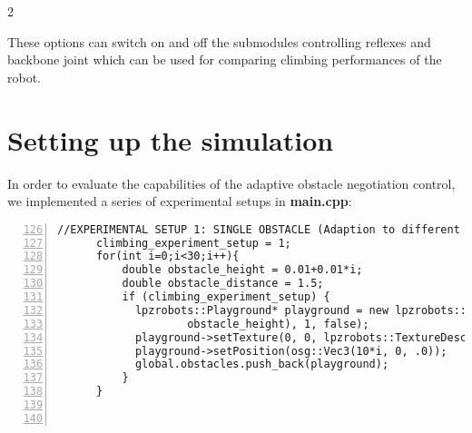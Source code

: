 \documentclass[a3, 14pt]{sciposter}
\begin{document}
\begin{multicols}{2}
\vspace{0.5cm}

These options can switch on and off the submodules controlling reflexes and backbone joint which can be used for comparing climbing performances of the robot.  
\section{Setting up the simulation}

In order to evaluate the capabilities of the adaptive obstacle negotiation control, we implemented a series of experimental setups in \textbf{main.cpp}:

\begin{lstlisting}[numbers = left, firstnumber = 126]
      //EXPERIMENTAL SETUP 1: SINGLE OBSTACLE (Adaption to different obstacle altitudes and walking gaits)
      climbing_experiment_setup = 1;
      for(int i=0;i<30;i++){
          double obstacle_height = 0.01+0.01*i;
          double obstacle_distance = 1.5;
          if (climbing_experiment_setup) {
            lpzrobots::Playground* playground = new lpzrobots::Playground(playgroundHandle, osgHandle, osg::Vec3(obstacle_distance, 0.6,
                    obstacle_height), 1, false);
            playground->setTexture(0, 0, lpzrobots::TextureDescr("Images/wall_bw.jpg", -0.5, -3));
            playground->setPosition(osg::Vec3(10*i, 0, .0));
            global.obstacles.push_back(playground);
          }
      }



\end{lstlisting}
\end{multicols}
\end{document}
